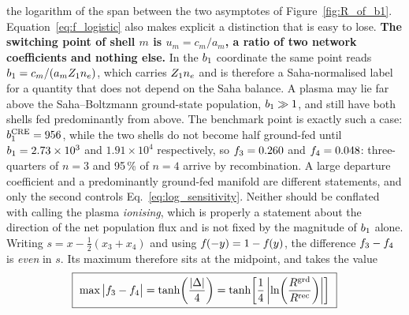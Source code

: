 \noindent the logarithm of the span between the two asymptotes of
Figure~\ref{fig:R_of_b1}. Equation~\eqref{eq:f_logistic} also makes explicit a
distinction that is easy to lose. \textbf{The switching point of shell $m$ is
$u_m = c_m/a_m$, a ratio of two network coefficients and nothing else.} In the
$b_1$ coordinate the same point reads
$b_1 = c_m/(a_mZ_{1}n_e)$, which carries $Z_{1}n_e$ and is therefore a
Saha-normalised label for a quantity that does not depend on the Saha balance.
A plasma may lie far above the Saha--Boltzmann ground-state
population, $b_1 \gg 1$, and still have both shells fed predominantly from
above. The
benchmark point is exactly such a case: $b_1^{\mathrm{CRE}} = 956$, while the
two shells do not become half ground-fed until $b_1 = 2.73\times10^{3}$ and
$1.91\times10^{4}$ respectively, so $f_{3} = 0.260$ and $f_{4} = 0.048$:
three-quarters of $n=3$ and 95\,\% of $n=4$ arrive by recombination.
A large departure coefficient and a predominantly ground-fed manifold are
different statements, and only the second controls
Eq.~\eqref{eq:log_sensitivity}. Neither should be conflated with calling the
plasma \emph{ionising}, which is properly a statement about the direction of the
net population flux and is not fixed by the magnitude of $b_1$ alone. Writing $s = x - \tfrac12(x_3+x_4)$ and using
$f_{}(-y) = 1 - f_{}(y)$, the difference $f_{3}-f_{4}$ is
\emph{even} in $s$. Its maximum therefore sits at the midpoint, and takes the
value
\begin{equation}
  \boxed{\ \max\big|f_{3}-f_{4}\big|
  = \tanh\!\left(\frac{|\Delta|}{4}\right)
  = \tanh\!\left[\frac{1}{4}\left|\ln\!\left(\frac{R^{\rm grd}}{R^{\rm rec}}\right)\right|\right]\ }
  \label{eq:peak_sensitivity}
\end{equation}

